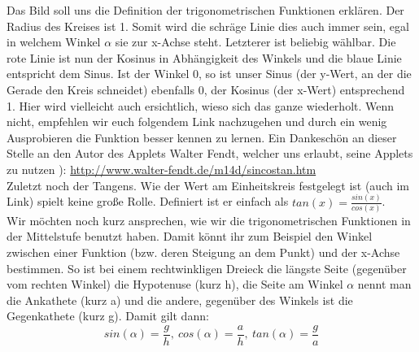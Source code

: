 			Das Bild soll uns die Definition der trigonometrischen Funktionen erklären.
			Der Radius des Kreises ist 1. Somit wird die schräge Linie dies auch immer
			sein, egal in welchem Winkel \(\alpha\) sie zur x-Achse steht. Letzterer ist
			beliebig wählbar. Die rote Linie ist nun der Kosinus in Abhängigkeit des
			Winkels und die blaue Linie entspricht dem Sinus. Ist der Winkel 0, so ist
			unser Sinus (der y-Wert, an der die Gerade den Kreis schneidet) ebenfalls 0,
			der Kosinus (der x-Wert) entsprechend 1. Hier wird vielleicht auch
			ersichtlich, wieso sich das ganze wiederholt. Wenn nicht, empfehlen wir euch
			folgendem Link nachzugehen und durch ein wenig Ausprobieren die Funktion
			besser kennen zu lernen. Ein Dankeschön an dieser Stelle an den Autor des
			Applets Walter Fendt, welcher uns erlaubt, seine Applets zu nutzen ):
			\url{http://www.walter-fendt.de/m14d/sincostan.htm}\\
			Zuletzt noch der Tangens. Wie der Wert am Einheitskreis festgelegt ist (auch
			im Link) spielt keine große Rolle. Definiert ist er einfach als
			\(tan(x)=\frac{sin(x)}{cos(x)}\).\\
			Wir möchten noch kurz ansprechen, wie wir die trigonometrischen Funktionen in
			der Mittelstufe benutzt haben. Damit könnt ihr zum Beispiel den Winkel
			zwischen einer Funktion (bzw. deren Steigung an dem Punkt) und der x-Achse
			bestimmen. So ist bei einem rechtwinkligen Dreieck die längste Seite
			(gegenüber vom rechten Winkel) die Hypotenuse (kurz h), die Seite am Winkel
			\(\alpha\) nennt man die Ankathete (kurz a) und die andere, gegenüber des
			Winkels ist die Gegenkathete (kurz g). Damit gilt dann:
			\[sin(\alpha)=\frac{g}{h},\ cos(\alpha)=\frac{a}{h},\
			tan(\alpha)=\frac{g}{a}\]
